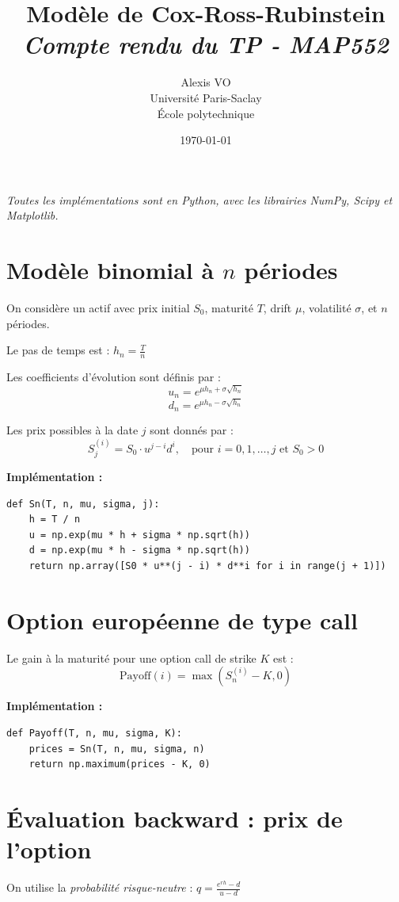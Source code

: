\documentclass[a4paper,11pt]{article}
\title{\Huge{\textbf{Modèle de Cox-Ross-Rubinstein}}\\ \medskip
      \Huge{\textit{Compte rendu du TP - MAP552}}\vspace*{0.7cm}}
\author{\LARGE{Alexis VO}\vspace{1cm}\\ \medskip
      Université Paris-Saclay\\École polytechnique}
\date{\vspace{0.2cm}\today}
\begin{document}
\maketitle
\newpage
\tableofcontents
\vspace{1cm}

\noindent \textit{Toutes les implémentations sont en Python, avec les librairies NumPy, Scipy et Matplotlib.}

\newpage

\section{Modèle binomial à $n$ périodes}

On considère un actif avec prix initial $S_0$, maturité $T$, drift $\mu$, volatilité $\sigma$, et $n$ périodes.

Le pas de temps est :
\(
h_n = \frac{T}{n}
\)

Les coefficients d'évolution sont définis par :
\[ u_n = e^{\mu h_n + \sigma \sqrt{h_n}}\]
\[ d_n = e^{\mu h_n - \sigma \sqrt{h_n}} \]

Les prix possibles à la date $j$ sont donnés par :
\[
\boxed{S_j^{(i)} = S_0 \cdot u^{j - i} d^i, \quad \text{pour } i = 0, 1, \dots, j \text{ et } S_0 > 0}
\]

\textbf{Implémentation :}
\begin{lstlisting}
def Sn(T, n, mu, sigma, j):
    h = T / n
    u = np.exp(mu * h + sigma * np.sqrt(h))
    d = np.exp(mu * h - sigma * np.sqrt(h))
    return np.array([S0 * u**(j - i) * d**i for i in range(j + 1)])
\end{lstlisting}

\section{Option européenne de type call}

Le gain à la maturité pour une option call de strike $K$ est :
\[
\boxed{\text{Payoff}(i) = \max(S_n^{(i)} - K, 0)}
\]

\textbf{Implémentation :}
\begin{lstlisting}
def Payoff(T, n, mu, sigma, K):
    prices = Sn(T, n, mu, sigma, n)
    return np.maximum(prices - K, 0)
\end{lstlisting}

\section{Évaluation backward : prix de l'option}
On utilise la \textit{probabilité risque-neutre} :
\( q = \frac{e^{r h} - d}{u - d}\)
\end{document}
